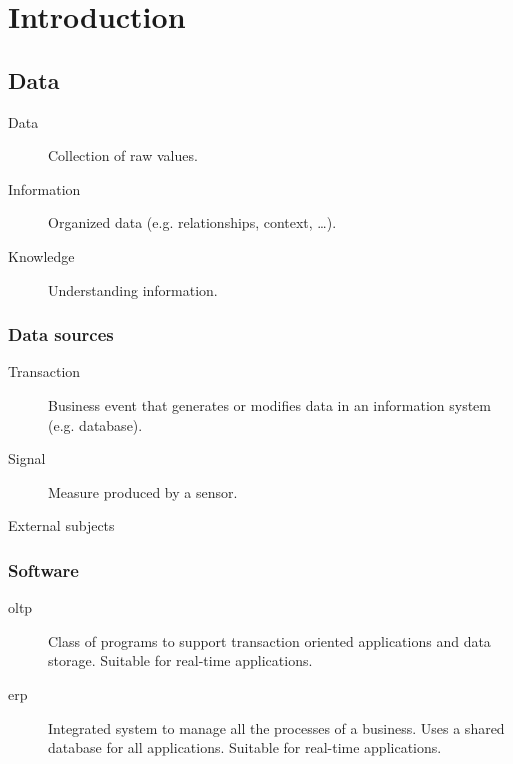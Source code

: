 \chapter{Introduction}


\section{Data}

\begin{description}
    \item[Data] 
        Collection of raw values.

    \item[Information] 
        Organized data (e.g. relationships, context, \dots).

    \item[Knowledge] 
        Understanding information.
\end{description}


\subsection{Data sources}
\begin{description}
    \item[Transaction] 
        Business event that generates or modifies data in an information system (e.g. database).

    \item[Signal] 
        Measure produced by a sensor.

    \item[External subjects]
\end{description}


\subsection{Software}
\begin{description}
    \item[\Ac{oltp}]  
        Class of programs to support transaction oriented applications and data storage.
        Suitable for real-time applications.

    \item[\Ac{erp}]  
        Integrated system to manage all the processes of a business.
        Uses a shared database for all applications.
        Suitable for real-time applications.
\end{description}


